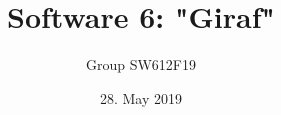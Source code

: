 \title{Software 6: "Giraf"} %
\date{28. May 2019}                                                        %
\def\groupnumber{Group SW612F19}                                                  %
\author{\groupnumber}                                                             %

\let\theauthor\author
\let\thedate\date


